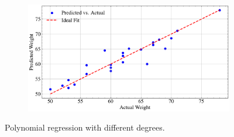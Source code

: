 \begin{figure}
\begin{subfigure}{0.48\linewidth}
    \end{subfigure}
    \begin{subfigure}{0.48\linewidth}
        \centering
        \includegraphics[width=\linewidth]{src/figures/polynominal-regression/polynomial_regression-n-4.png}
    \end{subfigure}
    \caption{Polynomial regression with different degrees.}\label{fig:polynomial-regression}
\end{figure}
